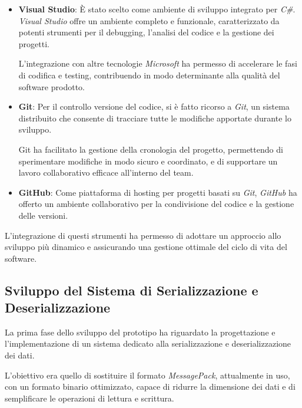 \documentclass[12pt,a4paper,openright,twoside]{book}
\begin{document}
            \begin{itemize}
                \item \textbf{Visual Studio}: È stato scelto come ambiente di sviluppo integrato per \textit{C\#}. \textit{Visual Studio} offre un ambiente completo e funzionale, caratterizzato da potenti strumenti per il debugging, l’analisi del codice e la gestione dei progetti.

                L’integrazione con altre tecnologie \textit{Microsoft} ha permesso di accelerare le fasi di codifica e testing, contribuendo in modo determinante alla qualità del software prodotto.

                \pagebreak

                \item \textbf{Git}: Per il controllo versione del codice, si è fatto ricorso a \textit{Git}, un sistema distribuito che consente di tracciare tutte le modifiche apportate durante lo sviluppo.

                Git ha facilitato la gestione della cronologia del progetto, permettendo di sperimentare modifiche in modo sicuro e coordinato, e di supportare un lavoro collaborativo efficace all'interno del team.

                \item \textbf{GitHub}: Come piattaforma di hosting per progetti basati su \textit{Git}, \textit{GitHub} ha offerto un ambiente collaborativo per la condivisione del codice e la gestione delle versioni.
            \end{itemize}

            L'integrazione di questi strumenti ha permesso di adottare un approccio allo sviluppo più dinamico e assicurando una gestione ottimale del ciclo di vita del software.

        \subsection{Sviluppo del Sistema di Serializzazione e Deserializzazione}

            La prima fase dello sviluppo del prototipo ha riguardato la progettazione e l’implementazione di un sistema dedicato alla serializzazione e deserializzazione dei dati.

            L’obiettivo era quello di sostituire il formato \textit{MessagePack}, attualmente in uso, con un formato binario ottimizzato, capace di ridurre la dimensione dei dati e di semplificare le operazioni di lettura e scrittura.
\end{document}
